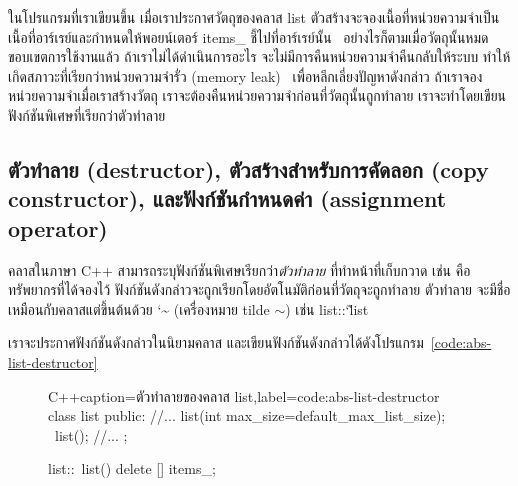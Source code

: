 ใน{\wbr}โปรแกรม{\wbr}ที่{\wbr}เรา{\wbr}เขียน{\wbr}ขึ้น เมื่อ{\wbr}เรา{\wbr}ประกาศ{\wbr}วัตถุ{\wbr}ของ{\wbr}ค{\wbr}ลา{\wbr}ส {\ct list}
ตัว{\wbr}สร้าง{\wbr}จะ{\wbr}จอง{\wbr}เนื้อที่{\wbr}หน่วยความจำ{\wbr}เป็น{\wbr}เนื้อที่{\wbr}อาร์เรย์{\wbr}และ{\wbr}กำหนด{\wbr}ให้{\wbr}พอยน์เตอร์ {\ct items\_}
ชี้{\wbr}ไป{\wbr}ที่{\wbr}อาร์เรย์{\wbr}นั้น \ อย่างไรก็ตาม{\wbr}เมื่อ{\wbr}วัตถุ{\wbr}นั้น{\wbr}หมด{\wbr}ขอบเขต{\wbr}การ{\wbr}ใช้{\wbr}งาน{\wbr}แล้ว{\wbr}
ถ้า{\wbr}เรา{\wbr}ไม่{\wbr}ได้{\wbr}ดำเนินการ{\wbr}อะไร จะ{\wbr}ไม่{\wbr}มี{\wbr}การ{\wbr}คืน{\wbr}หน่วยความจำ{\wbr}คืน{\wbr}กลับ{\wbr}ให้{\wbr}ระบบ{\wbr}
ทำ{\wbr}ให้{\wbr}เกิด{\wbr}สภาวะ{\wbr}ที่{\wbr}เรียก{\wbr}ว่า{\wbr}หน่วยความจำ{\wbr}รั่ว (memory leak) \ เพื่อ{\wbr}หลีกเลี่ยง{\wbr}ปัญหา{\wbr}ดังกล่าว{\wbr}
ถ้า{\wbr}เรา{\wbr}จอง{\wbr}หน่วยความจำ{\wbr}เมื่อ{\wbr}เรา{\wbr}สร้าง{\wbr}วัตถุ เรา{\wbr}จะ{\wbr}ต้อง{\wbr}คืน{\wbr}หน่วยความจำ{\wbr}ก่อน{\wbr}ที่{\wbr}วัตถุ{\wbr}นั้น{\wbr}ถูก{\wbr}ทำลาย{\wbr}
เรา{\wbr}จะ{\wbr}ทำ{\wbr}โดย{\wbr}เขียน{\wbr}ฟังก์ชัน{\wbr}พิเศษ{\wbr}ที่{\wbr}เรียก{\wbr}ว่า{\wbr}ตัว{\wbr}ทำลาย{\wbr}

\subsection{ตัว{\wbr}ทำลาย (destructor), ตัว{\wbr}สร้าง{\wbr}สำหรับ{\wbr}การ{\wbr}คัดลอก (copy constructor), และ{\wbr}ฟังก์ชัน{\wbr}กำหนด{\wbr}ค่า (assignment operator)}
ค{\wbr}ลา{\wbr}ส{\wbr}ใน{\wbr}ภาษา C++ สามารถ{\wbr}ระบุ{\wbr}ฟังก์ชัน{\wbr}พิเศษ{\wbr}เรียก{\wbr}ว่า{\em ตัว{\wbr}ทำลาย} ที่{\wbr}ทำ{\wbr}หน้าที่{\wbr}เก็บกวาด{\wbr}
เช่น คือ{\wbr}ทรัพยากร{\wbr}ที่{\wbr}ได้{\wbr}จอง{\wbr}ไว้ ฟังก์ชัน{\wbr}ดังกล่าว{\wbr}จะ{\wbr}ถูก{\wbr}เรียก{\wbr}โดย{\wbr}อัตโนมัติ{\wbr}ก่อน{\wbr}ที่{\wbr}วัตถุ{\wbr}จะ{\wbr}ถูก{\wbr}ทำลาย{\wbr}
ตัว{\wbr}ทำลาย จะ{\wbr}มี{\wbr}ชื่อ{\wbr}เหมือน{\wbr}กับ{\wbr}ค{\wbr}ลา{\wbr}ส{\wbr}แต่{\wbr}ขึ้นต้น{\wbr}ด้วย {\ct\char`\~} (เครื่องหมาย tilde
$\sim$) เช่น {\ct list::\char`\~list}

เรา{\wbr}จะ{\wbr}ประกาศ{\wbr}ฟังก์ชัน{\wbr}ดังกล่าว{\wbr}ใน{\wbr}นิยาม{\wbr}ค{\wbr}ลา{\wbr}ส
และ{\wbr}เขียน{\wbr}ฟังก์ชัน{\wbr}ดังกล่าว{\wbr}ได้{\wbr}ดัง{\wbr}โปรแกรม~\ref{code:abs-list-destructor}

\begin{figure}
\latintext
\begin{codelist}{C++}{caption={\thaitext ตัว{\wbr}ทำลาย{\wbr}ของ{\wbr}ค{\wbr}ลา{\wbr}ส {\ct list}\latintext},label=code:abs-list-destructor}
class list {
public:
  //...
  list(int max_size=default_max_list_size);
  ~list();
  //...
};

list::~list()
{
  delete [] items_;
}
\end{codelist}
\thaitext
\end{figure}

